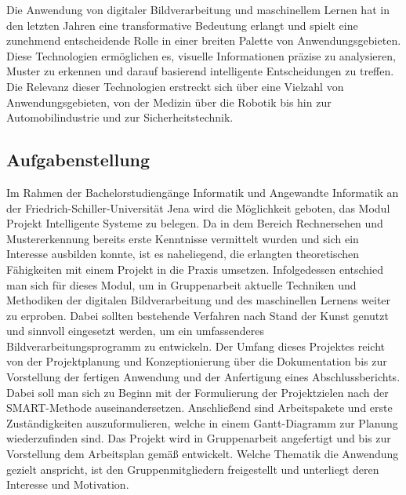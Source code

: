 Die Anwendung von digitaler Bildverarbeitung und maschinellem Lernen hat in den letzten Jahren eine transformative Bedeutung erlangt und spielt eine zunehmend entscheidende Rolle in einer breiten Palette von Anwendungsgebieten. Diese Technologien ermöglichen es, visuelle Informationen präzise zu analysieren, Muster zu erkennen und darauf basierend intelligente Entscheidungen zu treffen. Die Relevanz dieser Technologien erstreckt sich über eine Vielzahl von Anwendungsgebieten, von der Medizin über die Robotik bis hin zur Automobilindustrie und zur Sicherheitstechnik.

\subsection{Aufgabenstellung}
Im Rahmen der Bachelorstudiengänge Informatik und Angewandte Informatik an der Friedrich-Schiller-Universität Jena wird die Möglichkeit geboten, das Modul Projekt Intelligente Systeme zu belegen. Da in dem Bereich Rechnersehen und Mustererkennung bereits erste Kenntnisse vermittelt wurden und sich ein Interesse ausbilden konnte, ist es naheliegend, die erlangten theoretischen Fähigkeiten mit einem Projekt in die Praxis umsetzen. Infolgedessen entschied man sich für dieses Modul, um in Gruppenarbeit aktuelle Techniken und Methodiken der digitalen Bildverarbeitung und des maschinellen Lernens weiter zu erproben. Dabei sollten bestehende Verfahren nach Stand der Kunst genutzt und sinnvoll eingesetzt werden, um ein umfassenderes Bildverarbeitungsprogramm zu entwickeln. Der Umfang dieses Projektes reicht von der Projektplanung und Konzeptionierung über die Dokumentation bis zur Vorstellung der fertigen Anwendung und der Anfertigung eines Abschlussberichts. Dabei soll man sich zu Beginn mit der Formulierung der Projektzielen nach der SMART-Methode auseinandersetzen. Anschließend sind Arbeitspakete und erste Zuständigkeiten auszuformulieren, welche in einem Gantt-Diagramm zur Planung wiederzufinden sind. Das Projekt wird in Gruppenarbeit angefertigt und bis zur Vorstellung dem Arbeitsplan gemäß entwickelt. Welche Thematik die Anwendung gezielt anspricht, ist den Gruppenmitgliedern freigestellt und unterliegt deren Interesse und Motivation.

